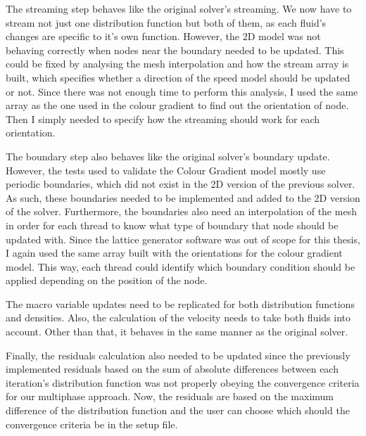 \documentclass[12pt, openany]{book}
\begin{document}
The streaming step behaves like the original solver's streaming. We now have to stream not just one distribution function but both of them, as each fluid's changes are specific to it's own function. However, the 2D model was not behaving correctly when nodes near the boundary needed to be updated. This could be fixed by analysing the mesh interpolation and how the stream array is built, which specifies whether a direction of the speed model should be updated or not. Since there was not enough time to perform this analysis, I used the same array as the one used in the colour gradient to find out the orientation of node. Then I simply needed to specify how the streaming should work for each orientation. \par
The boundary step also behaves like the original solver's boundary update. However, the tests used to validate the Colour Gradient model mostly use periodic boundaries, which did not exist in the 2D version of the previous solver. As such, these boundaries needed to be implemented and added to the 2D version of the solver. Furthermore, the boundaries also need an interpolation of the mesh in order for each thread to know what type of boundary that node should be updated with. Since the lattice generator software was out of scope for this thesis, I again used the same array built with the orientations for the colour gradient model. This way, each thread could identify which boundary condition should be applied depending on the position of the node. \par
The macro variable updates need to be replicated for both distribution functions and densities. Also, the calculation of the velocity needs to take both fluids into account. Other than that, it behaves in the same manner as the original solver. \par
Finally, the residuals calculation also needed to be updated since the previously implemented residuals based on the sum of absolute differences between each iteration's distribution function was not properly obeying the convergence criteria for our multiphase approach. Now, the residuals are based on the maximum difference of the distribution function and the user can choose which should the convergence criteria be in the setup file.    
\end{document}
